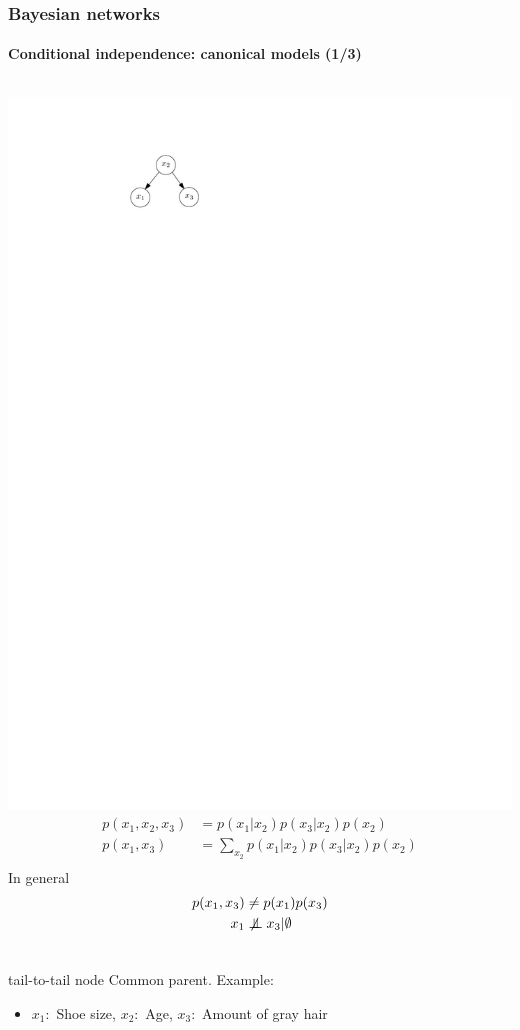 \documentclass[slidestop,compress,mathserif]{beamer}
\newcommand{\bi}{\begin{itemize}}
\newcommand{\ei}{\end{itemize}}
\newcommand{\notindep}{\ensuremath{\perp\mkern -10mu \perp \mkern -17mu \not \mkern 17mu}} %
\begin{document}
\begin{frame}
	\frametitle{Bayesian networks}
	\framesubtitle{Conditional independence: canonical models (1/3)}
  \begin{columns}
    \includegraphics[width=.7\textwidth]{headtohead3}%
   \begin{align*}
   p(x_1,x_2,x_3) & = p(x_1|x_2)p(x_3|x_2)p(x_2)\\
   p(x_1,x_3) & = \sum_{x_2}p(x_1|x_2)p(x_3|x_2)p(x_2)\\
   \end{align*}
   In general
   \begin{align*}
    p(x_1,x_3) & \neq p(x_1)p(x_3)\\
    x_1 & \notindep x_3 | \emptyset
   \end{align*}
   \end{columns} 
    \begin{block}{tail-to-tail node}
    Common parent. Example:
    \bi
    \item
     $x_1: $ Shoe size, $x_2 :$ Age, $x_3 :$ Amount of gray hair
    \ei
    \end{block}

\end{frame}
\end{document}
